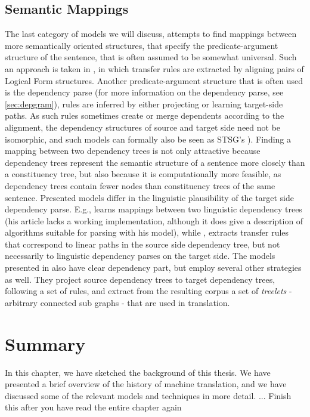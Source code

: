 \documentclass{report}
\theoremstyle{break}
\begin{document}
\subsection{Semantic Mappings}

The last category of models we will discuss, attempts to find mappings between more semantically oriented structures, that specify the predicate-argument structure of the sentence, that is often assumed to be somewhat universal. Such an approach is taken in \cite{menezes2003best}, in which transfer rules are extracted by aligning pairs of Logical Form structures. Another predicate-argument structure that is often used is the dependency parse (for more information on the dependency parse, see \ref{sec:depgram}), rules are inferred by either projecting or learning target-side paths. As such rules sometimes create or merge dependents according to the alignment, the dependency structures of source and target side need not be isomorphic, and such models can formally also be seen as STSG's \citep[as made explicit in][]{eisner2003learning}). Finding a mapping between two dependency trees is not only attractive because dependency trees represent the semantic structure of a sentence more closely than a constituency tree, but also because it is computationally more feasible, as dependency trees contain fewer nodes than constituency trees of the same sentence. Presented models differ in the linguistic plausibility of the target side dependency parse. E.g., \cite{eisner2003learning} learns mappings between two linguistic dependency trees (his article lacks a working implementation, although it does give a description of algorithms suitable for parsing with his model), while \cite{lin2004path}, extracts transfer rules that correspond to linear paths in the source side dependency tree, but not necessarily to linguistic dependency parses on the target side. The models presented in \cite{quirk2005dependency,quirk2006dependency,quirk2006we} also have clear dependency part, but employ several other strategies as well. They project source dependency trees to target dependency trees, following a set of rules, and extract from the resulting corpus a set of \textit{treelets} - arbitrary connected sub graphs - that are used in translation.

\section{Summary}

In this chapter, we have sketched the background of this thesis. We have presented a brief overview of the history of machine translation, and we have discussed some of the relevant models and techniques in more detail. 
... Finish this after you have read the entire chapter again
\end{document}
